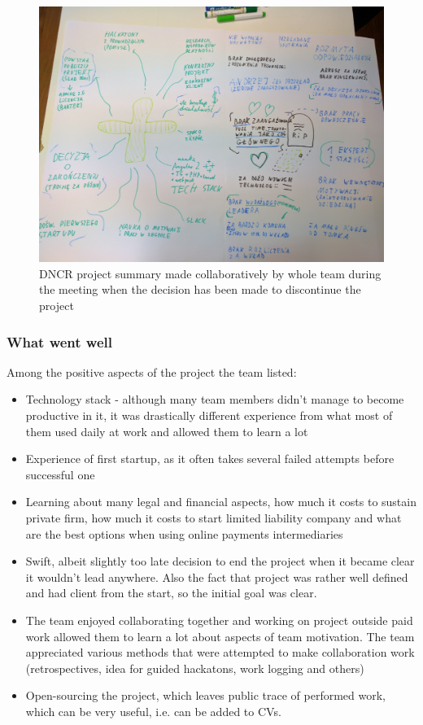 \documentclass{article}
\begin{document}
\begin{figure}[h]
    \includegraphics[width=\textwidth]{dncr-funeral}
    \caption{DNCR project summary made collaboratively by whole team during the meeting when the decision has been made to discontinue the project}
    \label{fig:dncr-funeral}
\end{figure}
\FloatBarrier

\subsubsection{What went well}

Among the positive aspects of the project the team listed:
\begin{itemize}
\item Technology stack - although many team members didn't manage to become productive in it, it was drastically different experience from what most of them used daily at work and allowed them to learn a lot
\item Experience of first startup, as it often takes several failed attempts before successful one
\item Learning about many legal and financial aspects, how much it costs to sustain private firm, how much it costs to start limited liability company and what are the best options when using online payments intermediaries
\item Swift, albeit slightly too late decision to end the project when it became clear it wouldn't lead anywhere. Also the fact that project was rather well defined and had client from the start, so the initial goal was clear.
\item The team enjoyed collaborating together and working on project outside paid work allowed them to learn a lot about aspects of team motivation. The team appreciated various methods that were attempted to make collaboration work (retrospectives, idea for guided hackatons, work logging and others)
\item Open-sourcing the project, which leaves public trace of performed work, which can be very useful, i.e. can be added to CVs.
\end{itemize}
\end{document}
